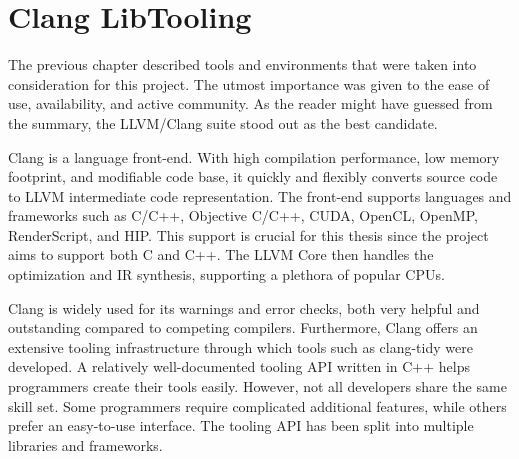 \chapter{Clang LibTooling}



The previous chapter described tools and environments that were taken
into consideration for this project. 
The utmost importance was given to the ease of use, availability, and 
active community. 
As the reader might have guessed from the summary, the LLVM/Clang 
suite stood out as the best candidate.

Clang is a language front-end. With high compilation performance, 
low memory footprint, and modifiable code base, it quickly and flexibly 
converts source code to LLVM intermediate code representation. 
The front-end supports languages and frameworks such as C/C++, 
Objective C/C++, CUDA, OpenCL, OpenMP, RenderScript, and HIP. 
This support is crucial for this thesis since the project 
aims to support both C and C++. 
The LLVM Core then handles the optimization and IR synthesis, 
supporting a plethora of popular CPUs.

Clang is widely used for its warnings and error checks, both very 
helpful and outstanding compared to competing compilers. 
Furthermore, Clang offers an extensive tooling infrastructure 
through which tools such as clang-tidy were developed. 
A relatively well-documented tooling API written in C++ helps 
programmers create their tools easily. 
However, not all developers share the same skill set. 
Some programmers require complicated additional features, while others 
prefer an easy-to-use interface. 
The tooling API has been split into multiple libraries and frameworks. 

